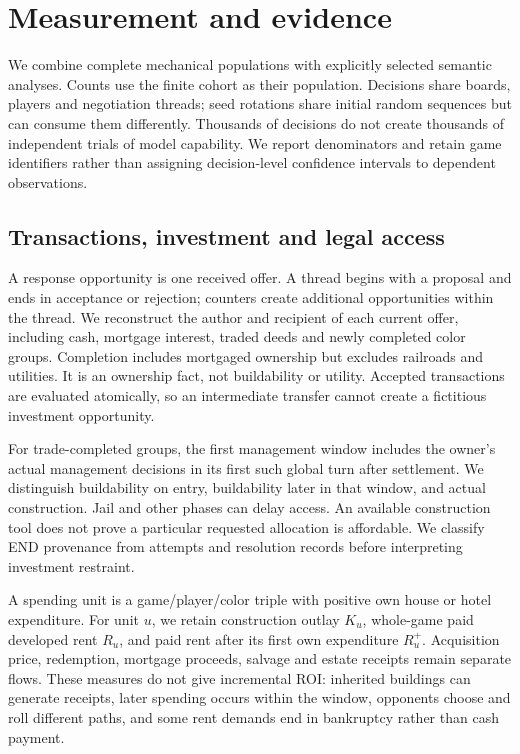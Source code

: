 \section{Measurement and evidence}
\label{sec:methods}

We combine complete mechanical populations with explicitly selected semantic analyses. Counts use the finite cohort as their population. Decisions share boards, players and negotiation threads; seed rotations share initial random sequences but can consume them differently. Thousands of decisions do not create thousands of independent trials of model capability. We report denominators and retain game identifiers rather than assigning decision-level confidence intervals to dependent observations.

\subsection{Transactions, investment and legal access}

A response opportunity is one received offer. A thread begins with a proposal and ends in acceptance or rejection; counters create additional opportunities within the thread. We reconstruct the author and recipient of each current offer, including cash, mortgage interest, traded deeds and newly completed color groups. Completion includes mortgaged ownership but excludes railroads and utilities. It is an ownership fact, not buildability or utility. Accepted transactions are evaluated atomically, so an intermediate transfer cannot create a fictitious investment opportunity.

For trade-completed groups, the first management window includes the owner's actual management decisions in its first such global turn after settlement. We distinguish buildability on entry, buildability later in that window, and actual construction. Jail and other phases can delay access. An available construction tool does not prove a particular requested allocation is affordable. We classify END provenance from attempts and resolution records before interpreting investment restraint.

A spending unit is a game/player/color triple with positive own house or hotel expenditure. For unit $u$, we retain construction outlay $K_u$, whole-game paid developed rent $R_u$, and paid rent after its first own expenditure $R_u^{+}$. Acquisition price, redemption, mortgage proceeds, salvage and estate receipts remain separate flows. These measures do not give incremental ROI: inherited buildings can generate receipts, later spending occurs within the window, opponents choose and roll different paths, and some rent demands end in bankruptcy rather than cash payment.

